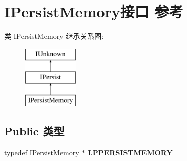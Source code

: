 \hypertarget{interface_i_persist_memory}{}\section{I\+Persist\+Memory接口 参考}
\label{interface_i_persist_memory}
类 I\+Persist\+Memory 继承关系图\+:\begin{figure}[H]
\begin{center}
\leavevmode
\includegraphics[height=3.000000cm]{interface_i_persist_memory}
\end{center}
\end{figure}
\subsection*{Public 类型}
\begin{DoxyCompactItemize}
\item 
\mbox{\label{interface_i_persist_memory_a0c3e1a0154df67e222f41e0ba69a704e}} 
typedef \hyperlink{interface_i_persist_memory}{I\+Persist\+Memory} $\ast$ {\bfseries L\+P\+P\+E\+R\+S\+I\+S\+T\+M\+E\+M\+O\+RY}
\end{DoxyCompactItemize}
